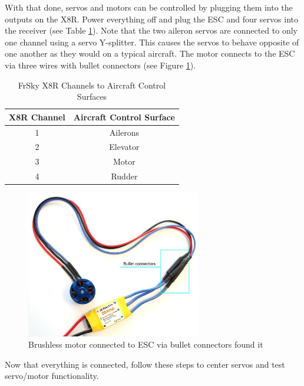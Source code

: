 \documentclass[12pt,journal,compsoc]{IEEEtran}
\begin{document}
With that done, servos and motors can be controlled by plugging them into the outputs on the X8R. Power everything off and plug the ESC and four servos into the receiver (see Table \ref{x8rChannels}). Note that the two aileron servos are connected to only one channel using a servo Y-splitter. This causes the servos to behave opposite of one another as they would on a typical aircraft. The motor connects to the ESC via three wires with bullet connectors (see Figure \ref{motorToEsc}).
\begin{table}[h!]
\caption{FrSky X8R Channels to Aircraft Control Surfaces}
\centering
\begin{tabular}{|c|c|}
\hline
X8R Channel & Aircraft Control Surface \\
\hline
1 & Ailerons \\
\hline
2 & Elevator \\
\hline
3 & Motor \\
\hline
4 & Rudder\\
\hline
\end{tabular}
\label{x8rChannels}
\end{table}

\begin{figure}[h!]
\hspace*{0cm}
\centering
\includegraphics[width=3in]{motorToEsc.jpg}
\caption{Brushless motor connected to ESC via bullet connectors found it \cite{mToE}}
\label{motorToEsc}
\end{figure}
Now that everything is connected, follow these steps to center servos and test servo/motor functionality.
\end{document}
